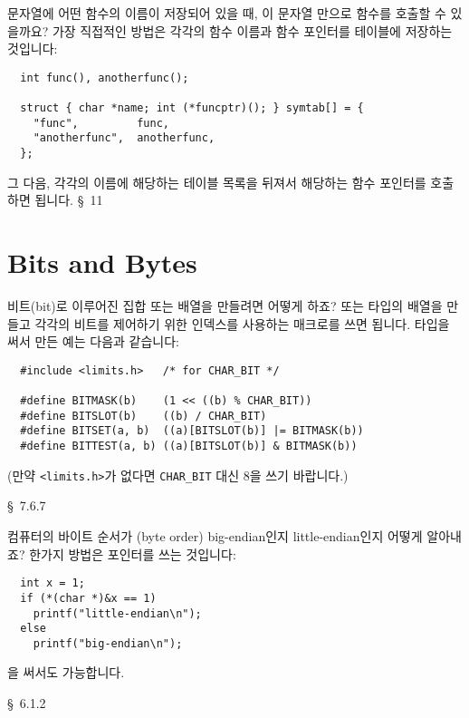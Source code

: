 \begin{faq}
	문자열에 어떤 함수의 이름이 저장되어 있을 때, 이 문자열 만으로
	함수를 호출할 수 있을까요?
\A
	가장 직접적인 방법은 각각의 함수 이름과 함수 포인터를 테이블에
	저장하는 것입니다:

\begin{verbatim}
  int func(), anotherfunc();

  struct { char *name; int (*funcptr)(); } symtab[] = {
    "func",         func,
    "anotherfunc",  anotherfunc,
  };
\end{verbatim}
	
	\noindent 그 다음, 각각의 이름에 해당하는 테이블 목록을 뒤져서
	해당하는 함수 포인터를 호출하면 됩니다.  
\R
	\cite{pcs} \S\ 11 
\end{faq}

\section{Bits and Bytes}	\label{sec:bitbyte}

\begin{faq}
	비트(bit)로 이루어진 집합 또는 배열을 만들려면 어떻게 하죠?
\A
	 또는  타입의 배열을 만들고 각각의 비트를
	제어하기 위한 인덱스를 사용하는 매크로를 쓰면 됩니다.
	 타입을 써서 만든 예는 다음과 같습니다:
\begin{verbatim}
  #include <limits.h>   /* for CHAR_BIT */

  #define BITMASK(b)    (1 << ((b) % CHAR_BIT))
  #define BITSLOT(b)    ((b) / CHAR_BIT)
  #define BITSET(a, b)  ((a)[BITSLOT(b)] |= BITMASK(b))
  #define BITTEST(a, b) ((a)[BITSLOT(b)] & BITMASK(b))
\end{verbatim}
	\noindent (만약 \verb+<limits.h>+가 없다면 \verb+CHAR_BIT+ 대신
	8을 쓰기 바랍니다.)

\R
	\cite{hs} \S\ 7.6.7 
\end{faq}

\begin{faq}
	컴퓨터의 바이트 순서가 (byte order) big-endian인지 little-endian인지
	어떻게 알아내죠?
\A
	한가지 방법은 포인터를 쓰는 것입니다:
\begin{verbatim}
  int x = 1;
  if (*(char *)&x == 1)
    printf("little-endian\n");
  else
    printf("big-endian\n");
\end{verbatim}
	\noindent {}을 써서도 가능합니다.

\R
	\cite{hs} \S\ 6.1.2 
\end{faq}

